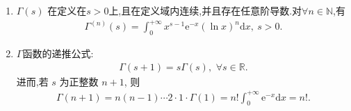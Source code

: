\documentclass[../../main.tex]{subfiles}%
\begin{document}
\begin{theorem}\label{theorem:Gamma函数的性质}
\begin{enumerate}[(1)]
\item  $\Gamma(s)$ 在定义在$s>0$上,且在定义域内连续,并且存在任意阶导数.对$\forall n\in \mathbb{N}$,有
\begin{align*}
\Gamma^{(n)}(s) = \int_{0}^{+\infty} x^{s-1} \mathrm{e}^{-x} (\ln x)^n \mathrm{d}x,\ s > 0.
\end{align*}

\item $\Gamma$函数的递推公式:
\begin{align}
\Gamma(s+1) = s\Gamma(s),\,\,\forall s\in \mathbb{R}.\label{eq::290-jriowuthj3f9ejfgs}
\end{align}
进而,若 $s$ 为正整数 $n+1$, 则
\begin{align}\label{eq:902uu9099999999}
\Gamma(n+1) = n(n-1)\cdots2\cdot1\cdot\Gamma(1) = n! \int_{0}^{+\infty} \mathrm{e}^{-x} \mathrm{d}x = n!. 
\end{align}

\end{enumerate}
\end{theorem}
\end{document}
